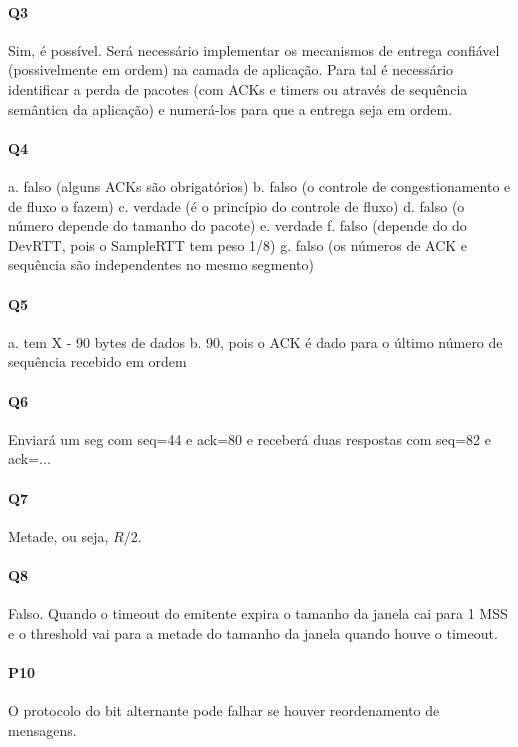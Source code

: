 \paragraph{Q3} Sim, é possível. 
Será necessário implementar os mecanismos de entrega confiável (possivelmente em ordem) na camada de aplicação.
Para tal é necessário identificar a perda de pacotes (com ACKs e timers ou através de sequência semântica da aplicação) e numerá-los para que a entrega seja em ordem.

\paragraph{Q4} a. falso (alguns ACKs são obrigatórios)
b. falso (o controle de congestionamento e de fluxo o fazem)
c. verdade (é o princípio do controle de fluxo)
d. falso (o número depende do tamanho do pacote)
e. verdade
f. falso (depende do do DevRTT, pois o SampleRTT tem peso 1/8)
g. falso (os números de ACK e sequência são independentes no mesmo segmento)

\paragraph{Q5} a. tem X - 90 bytes de dados
b. 90, pois o ACK é dado para o último número de sequência recebido em ordem

\paragraph{Q6} Enviará um seg com seq=44 e ack=80 e receberá duas respostas com seq=82 e ack=...

\paragraph{Q7} Metade, ou seja, $R/2$.

\paragraph{Q8} Falso. Quando o timeout do emitente expira o tamanho da janela cai para 1 MSS e o threshold vai para a metade do tamanho da janela quando houve o timeout.

\paragraph{P10} O protocolo do bit alternante pode falhar se houver reordenamento de mensagens.

